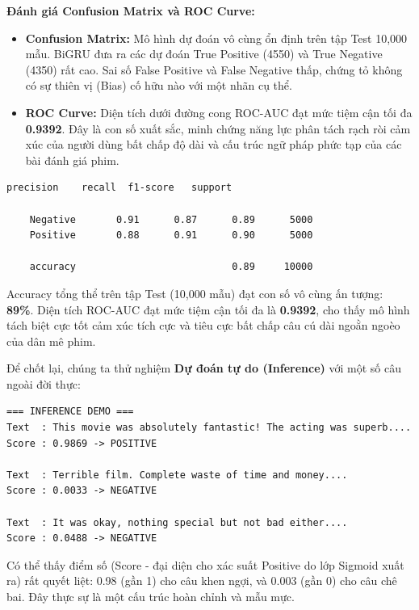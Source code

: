 \textbf{Đánh giá Confusion Matrix và ROC Curve:}
\begin{itemize}
    \item \textbf{Confusion Matrix:} Mô hình dự đoán vô cùng ổn định trên tập Test 10,000 mẫu. BiGRU đưa ra các dự đoán True Positive (4550) và True Negative (4350) rất cao. Sai số False Positive và False Negative thấp, chứng tỏ không có sự thiên vị (Bias) cố hữu nào với một nhãn cụ thể.
    \item \textbf{ROC Curve:} Diện tích dưới đường cong ROC-AUC đạt mức tiệm cận tối đa \textbf{0.9392}. Đây là con số xuất sắc, minh chứng năng lực phân tách rạch ròi cảm xúc của người dùng bất chấp độ dài và cấu trúc ngữ pháp phức tạp của các bài đánh giá phim.
\end{itemize}

\begin{lstlisting}[style=consoleoutput, caption={Output: Báo cáo hiệu năng Precision và Recall}]
              precision    recall  f1-score   support

    Negative       0.91      0.87      0.89      5000
    Positive       0.88      0.91      0.90      5000

    accuracy                           0.89     10000
\end{lstlisting}

Accuracy tổng thể trên tập Test (10,000 mẫu) đạt con số vô cùng ấn tượng: \textbf{89\%}. Diện tích ROC-AUC đạt mức tiệm cận tối đa là \textbf{0.9392}, cho thấy mô hình tách biệt cực tốt cảm xúc tích cực và tiêu cực bất chấp câu cú dài ngoằn ngoèo của dân mê phim.

Để chốt lại, chúng ta thử nghiệm \textbf{Dự đoán tự do (Inference)} với một số câu ngoài đời thực:

\begin{lstlisting}[style=consoleoutput, caption={Output: Test Inference ngẫu nhiên}]
=== INFERENCE DEMO ===
Text  : This movie was absolutely fantastic! The acting was superb....
Score : 0.9869 -> POSITIVE

Text  : Terrible film. Complete waste of time and money....
Score : 0.0033 -> NEGATIVE

Text  : It was okay, nothing special but not bad either....
Score : 0.0488 -> NEGATIVE
\end{lstlisting}

Có thể thấy điểm số (Score - đại diện cho xác suất Positive do lớp Sigmoid xuất ra) rất quyết liệt: 0.98 (gần 1) cho câu khen ngợi, và 0.003 (gần 0) cho câu chê bai.
Đây thực sự là một cấu trúc hoàn chỉnh và mẫu mực.
